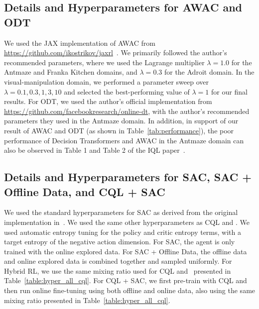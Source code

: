 \subsection{Details and Hyperparameters for AWAC and ODT}
We used the JAX implementation of AWAC from \url{https://github.com/ikostrikov/jaxrl}~\cite{jaxrl}. We primarily followed the author's recommended parameters, where we used the Lagrange multiplier $\lambda = 1.0$ for the Antmaze and Franka Kitchen domains, and $\lambda = 0.3$ for the Adroit domain. In the visual-manipulation domain, we performed a parameter sweep over $\lambda = 0.1, 0.3, 1, 3, 10$ and selected the best-performing value of $\lambda = 1$ for our final results. For ODT, we used the author's official implementation from \url{https://github.com/facebookresearch/online-dt}, with the author's recommended parameters they used in the Antmaze domain. In addition, in support of our result of AWAC and ODT (as shown in Table~\ref{tab:performance}), the poor performance of Decision Transformers and AWAC in the Antmaze domain can also be observed in Table 1 and Table 2 of the IQL paper~\citep{kostrikov2021iql}.

\subsection{Details and Hyperparameters for SAC, SAC + Offline Data, and CQL + SAC}
We used the standard hyperparameters for SAC as derived from the original implementation in~\cite{sac}. We used the same other hyperparameters as CQL and \methodname. We used automatic entropy tuning for the policy and critic entropy terms, with a target entropy of the negative action dimension. For SAC, the agent is only trained with the online explored data. For SAC + Offline Data, the offline data and online explored data is combined together and sampled uniformly. For Hybrid RL, we use the same mixing ratio used for CQL and \methodname\ presented in Table~\ref{table:hyper_all_cql}. For CQL + SAC, we first pre-train with CQL and then run online fine-tuning using both offline and online data, also using the same mixing ratio presented in Table~\ref{table:hyper_all_cql}. 

